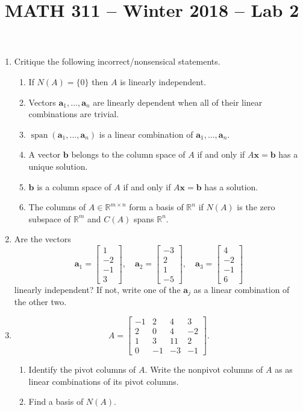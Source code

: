 \documentclass[12pt]{amsart}
\newcommand{\RR}{\mathbb{R}}
\DeclareMathOperator{\Span}{span}
\theoremstyle{definition} \newtheorem{definition}[theorem]{Definition}
\newcommand{\ba}{\mathbf{a}}
\newcommand{\bb}{\mathbf{b}}
\newcommand{\bx}{\mathbf{x}}
\newcommand{\mat}[1]{\begin{bmatrix}#1\end{bmatrix}}
\newcommand{\spn}[1]{\Span\left(#1\right)}
\begin{document}
\title{MATH 311 -- Winter 2018 -- Lab 2}
\maketitle

\begin{enumerate}

  \setlength{\itemsep}{1em}

  \item Critique the following incorrect/nonsensical statements.

    \begin{enumerate}
      \setlength{\itemsep}{0.5em}
      \bigskip
      \item If $N(A)=\{0\}$ then $A$ is linearly independent.

      \item Vectors $\ba_1,\ldots,\ba_n$ are linearly dependent when all of their linear combinations are trivial.

      \item $\spn{\ba_1,\ldots,\ba_n}$ is a linear combination of $\ba_1,\ldots,\ba_n$.

      \item A vector $\bb$ belongs to the column space of $A$ if and only if $A\bx=\bb$ has a unique solution.

      \item $\bb$ is a column space of $A$ if and only if $A\bx=\bb$ has a solution.

      \item The columns of $A\in\RR^{m\times n}$ form a basis of $\RR^n$ if $N(A)$ is the zero subspace of $\RR^m$ and $C(A)$ spans $\RR^n$.
    \end{enumerate}

  \item Are the vectors
    \[
      \ba_1 = \mat{1\\-2\\-1\\3},\quad \ba_2=\mat{-3\\2\\1\\-5},\quad
      \ba_3 = \mat{4\\-2\\-1\\6}
    \]
    linearly independent? If not, write one of the $\ba_j$ as a linear combination of the other two.

  \item 
    \[
      A =\begin{bmatrix}-1 & 2 & 4 & 3\\2 & 0 & 4 & -2\\1 & 3 & 11 & 2\\0 & -1 & -3 & -1\end{bmatrix}.
    \]
    \bigskip
    \begin{enumerate}
      \setlength{\itemsep}{0.5em}
      \item Identify the pivot columns of $A$. Write the nonpivot columns of $A$ as as linear combinations of its pivot columns.
      \item Find a basis of $N(A)$.
    \end{enumerate}


\end{enumerate}
\end{document}
